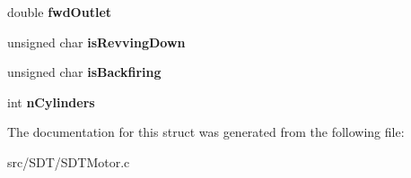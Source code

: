 \begin{DoxyCompactItemize}
\item 
\hypertarget{struct_s_d_t_motor_a42e250be62426b4927f7c28b9aa27f57}{}double {\bfseries fwd\+Outlet}\label{struct_s_d_t_motor_a42e250be62426b4927f7c28b9aa27f57}

\item 
\hypertarget{struct_s_d_t_motor_a24612b9fc9df049ec9bce0ff06948e2b}{}unsigned char {\bfseries is\+Revving\+Down}\label{struct_s_d_t_motor_a24612b9fc9df049ec9bce0ff06948e2b}

\item 
\hypertarget{struct_s_d_t_motor_a8a51d3a124687e53cc7f49f246825b95}{}unsigned char {\bfseries is\+Backfiring}\label{struct_s_d_t_motor_a8a51d3a124687e53cc7f49f246825b95}

\item 
\hypertarget{struct_s_d_t_motor_a561743327edbd529d3aad08d64f80768}{}int {\bfseries n\+Cylinders}\label{struct_s_d_t_motor_a561743327edbd529d3aad08d64f80768}

\end{DoxyCompactItemize}


The documentation for this struct was generated from the following file\+:\begin{DoxyCompactItemize}
\item 
src/\+S\+D\+T/S\+D\+T\+Motor.\+c\end{DoxyCompactItemize}
